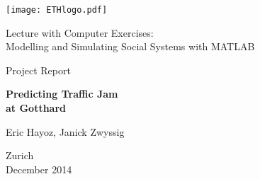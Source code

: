 
\thispagestyle{empty}

\begin{center}
\texttt{[image: ETHlogo.pdf]}

\bigskip


\bigskip


\bigskip


\LARGE{ 	Lecture with Computer Exercises:\\ }
\LARGE{ Modelling and Simulating Social Systems with MATLAB\\}

\bigskip

\bigskip

\small{Project Report}\\

\bigskip

\bigskip

\bigskip

\bigskip

\bigskip

\begin{center}
\textbf{\huge{Predicting Traffic Jam}}\\ \vspace{.2cm}
\textbf{\huge{at Gotthard}}\\
\end{center}
\bigskip

\bigskip

\vspace{1cm}

\Large{Eric Hayoz, Janick Zwyssig}



\bigskip

\bigskip

\bigskip

\bigskip

\bigskip

\bigskip

\bigskip
\vspace{3cm}

Zurich\\
December 2014\\

\end{center}


